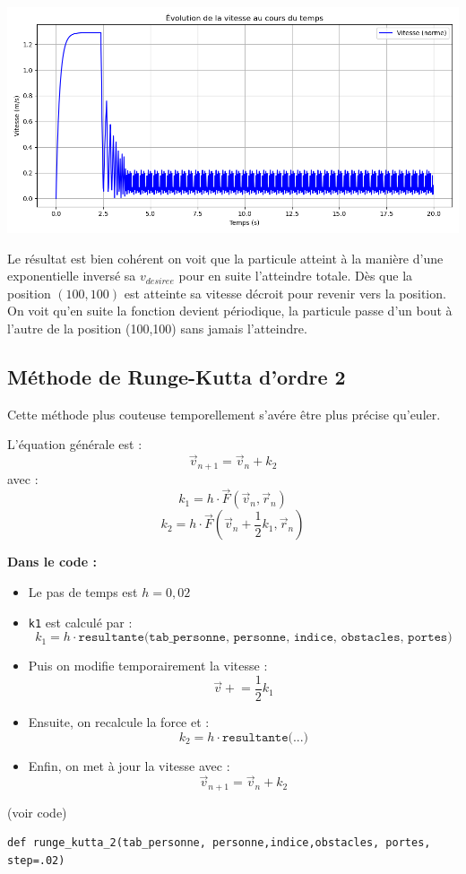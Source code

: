\documentclass[a4paper,12pt]{article}
\begin{document}
\includegraphics[width=\textwidth]{graph_vitesse.png} %

Le résultat est bien cohérent on voit que la particule atteint à la manière d'une exponentielle inversé sa $v_{desiree}$ pour en suite l'atteindre totale. Dès que la position $(100,100)$ est atteinte sa vitesse décroit pour revenir vers la position. On voit qu'en suite la fonction devient périodique, la particule passe d'un bout à l'autre de la position (100,100) sans jamais l'atteindre.


\subsection*{Méthode de Runge-Kutta d'ordre 2}

Cette méthode plus couteuse temporellement s'avére être plus précise qu'euler.

L’équation générale est :
\[
\vec{v}_{n+1} = \vec{v}_n + k_2
\]
avec :
\[
k_1 = h \cdot \vec{F}(\vec{v}_n, \vec{r}_n)
\]
\[
k_2 = h \cdot \vec{F} \left( \vec{v}_n + \frac{1}{2}k_1, \vec{r}_n \right)
\]

\textbf{Dans le code :}
\begin{itemize}
    \item Le pas de temps est $h = 0{,}02$
    \item \texttt{k1} est calculé par :
    \[
    k_1 = h \cdot \texttt{resultante(tab\_personne, personne, indice, obstacles, portes)}
    \]
    \item Puis on modifie temporairement la vitesse :
    \[
    \vec{v} \mathrel{+}= \frac{1}{2} k_1
    \]
    \item Ensuite, on recalcule la force et :
    \[
    k_2 = h \cdot \texttt{resultante(...)}
    \]
    \item Enfin, on met à jour la vitesse avec :
    \[
    \vec{v}_{n+1} = \vec{v}_n + k_2
    \]
\end{itemize}
(voir code)
\begin{verbatim}
def runge_kutta_2(tab_personne, personne,indice,obstacles, portes, step=.02)
\end{verbatim}
\end{document}
